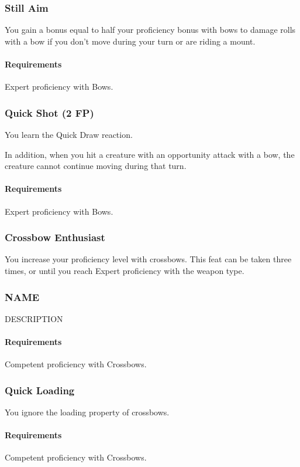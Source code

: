 \subsubsection{Still Aim} \label{feat::stillaim}
    You gain a bonus equal to half your proficiency bonus with bows to damage rolls with a bow if you don't move during your turn or are riding a mount.
    \paragraph{Requirements} Expert proficiency with Bows.
\subsubsection{Quick Shot (2 FP)} \label{feat::quickshot}
    You learn the Quick Draw reaction.

    In addition, when you hit a creature with an opportunity attack with a bow, the creature cannot continue moving during that turn.
    \paragraph{Requirements} Expert proficiency with Bows.
\subsubsection{Crossbow Enthusiast} \label{feat::crossbowenthusiast}
    You increase your proficiency level with crossbows.
    This feat can be taken three times, or until you reach Expert proficiency with the weapon type.
\subsubsection{NAME} \label{feat::name}
    DESCRIPTION
    \paragraph{Requirements} Competent proficiency with Crossbows.
\subsubsection{Quick Loading} \label{feat::quickloading}
    You ignore the loading property of crossbows.
    \paragraph{Requirements} Competent proficiency with Crossbows.
